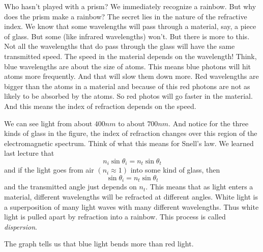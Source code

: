 \documentclass{article}
\begin{document}
Who hasn't played with a prism? We immediately recognize a rainbow. But why
does the prism make a rainbow? The secret lies in the nature of the
refractive index. We know that some wavelengths will pass through a
material, say, a piece of glass. But some (like infrared wavelengths) won't.
But there is more to this. Not all the wavelengths that do pass through the
glass will have the same transmitted speed. The speed in the material
depends on the wavelength! Think, blue wavelengths are about the size of
atoms. This means blue photons will hit atoms more frequently. And that will
slow them down more. Red wavelengths are bigger than the atoms in a material
and because of this red photons are not as likely to be absorbed by the
atoms. So red photos will go faster in the material. And this means the
index of refraction depends on the speed.

We can see light from about $400\unit{nm}$ to about $700\unit{nm}.$ And
notice for the three kinds of glass in the figure, the index of refraction
changes over this region of the electromagnetic spectrum. Think of what this
means for Snell's law. We learned last lecture that 
\[
n_{i}\sin \theta _{i}=n_{t}\sin \theta _{t}
\]%
and if the light goes from air $\left( n_{i}\approx 1\right) $ into some
kind of glass, then 
\[
\sin \theta _{i}=n_{t}\sin \theta _{t}
\]%
and the transmitted angle just depends on $n_{t}.$ This means that as light
enters a material, different wavelengths will be refracted at different
angles. White light is a superposition of many light waves with many
different wavelengths. Thus white light is pulled apart by refraction into a
rainbow. This process is called \emph{dispersion}.

The graph tells us that blue light bends more than red light. 
\end{document}
